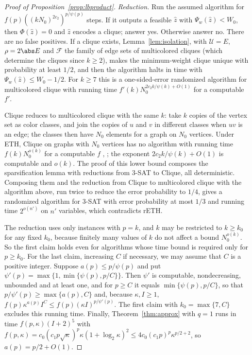 \begin{proof}[Proof of Proposition~\ref{prop:lbproduct}]
\emph{Reduction.} Run the assumed algorithm for
$f(p)((kN_0)^{2c_2})^{p/\psi(p)}$ steps. If it outputs a feasible $\hat z$
with $\Psi_w(\hat z)<W_0$, then $\Phi(\hat z)=0$ and $\hat z$ encodes a
clique; answer yes. Otherwise answer no. There are no false positives. If a
clique exists, Lemma~\ref{lem:isolation}, with $\mathcal U=E$, $\rho=2\abs E$
and $\mathcal F$ the family of edge sets of multicolored cliques (which
determine the cliques since $k\ge2$), makes the minimum-weight clique unique
with probability at least $1/2$, and then the algorithm halts in time with
$\Psi_w(\hat z)\le W_0-1/2$. For $k\ge7$ this is a one-sided-error randomized
algorithm for multicolored clique with running time
$f'(k)N_0^{2c_2k/\psi(k)+O(1)}$ for a computable $f'$.

Clique reduces to multicolored clique with the same $k$: take $k$ copies of
the vertex set as color classes, and join the copies of $u$ and $v$ in
different classes when $uv$ is an edge; the classes then have $N_0$ elements
for a graph on $N_0$ vertices. Under ETH, Clique on graphs with $N_0$ vertices
has no algorithm with running time $f(k)N_0^{o(k)}$ for a computable $f$
\cite{ChenEtAl2006}, \cite[Theorem~14.21]{CyganEtAl2015}; the exponent
$2c_2k/\psi(k)+O(1)$ is computable and $o(k)$. The proof of this lower bound
composes the sparsification lemma with reductions from 3-SAT to Clique, all
deterministic. Composing them and the reduction from Clique to multicolored
clique with the algorithm above, run twice to reduce the error probability
to $1/4$, gives a randomized algorithm for 3-SAT with error probability at
most $1/3$ and running time $2^{o(n')}$ on $n'$ variables, which contradicts
rETH.

The reduction uses only instances with $p=k$, and $k$ may be restricted to
$k\ge k_0$ for any fixed $k_0$, because finitely many values of $k$ do not
affect a bound $N_0^{o(k)}$. So the first claim holds even for algorithms whose
time bound is required only for $p\ge k_0$. For the last claim, increasing
$C$ if necessary, we may assume that $C$ is a positive integer. Suppose
$a(p)\le p/\psi(p)$ and put $\psi'(p)=\max\{1,\min\{\psi(p),p/C\}\}$. Then
$\psi'$ is computable, nondecreasing, unbounded and at least one, and for
$p\ge C$ it equals $\min\{\psi(p),p/C\}$, so that
$p/\psi'(p)\ge\max\{a(p),C\}$ and, because $\kappa,I\ge1$,
$f(p)\kappa^{a(p)}I^C\le f(p)(\kappa I)^{p/\psi'(p)}$. The first claim with
$k_0=\max\{7,C\}$ excludes this running time. Finally,
Theorem~\ref{thm:approx} with $q=1$ runs in time
$f(p,\kappa)(I+2)^5$ with
$f(p,\kappa)=c_0(c_1p\sqrt\kappa)^p\kappa(1+\log_2\kappa)^2
\le4c_0(c_1p)^p\kappa^{p/2+2}$, so $a(p)=p/2+O(1)$.
\end{proof}
